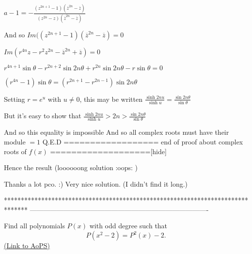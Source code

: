 \begin{solution}
$a-1=-\frac{(z^{2n+1}-1)(\overline z^{2n}-\overline z)}{(z^{2n}-z)(\overline z^{2n}-\overline z)}$

And so $Im((z^{2n+1}-1)(\overline z^{2n}-\overline z)=0$

$Im(r^{4n}z-r^2z^{2n}-\overline z^{2n}+\overline z)=0$

$r^{4n+1}\sin\theta -r^{2n+2}\sin 2n\theta +r^{2n}\sin 2n\theta -r\sin \theta=0$

$(r^{4n}-1)\sin\theta =(r^{2n+1}-r^{2n-1})\sin 2n\theta$

Setting $r=e^u$ with $u\ne 0$, this may be written $\frac{\sinh 2nu}{\sinh u}=\frac{\sin 2n\theta}{\sin\theta}$

But it's easy to show that $\frac{\sinh 2nu}{\sinh u}>2n>\frac{\sin 2n\theta}{\sin\theta}$

And so this equality is impossible
And so all complex roots must have their module $=1$
Q.E.D
================== end of proof about complex roots of $f(x)$ ===================[\/hide]

Hence the result
(loooooong solution :oops: )
\end{solution}



\begin{solution}
	Thanks a lot pco. :) Very nice solution. (I didn't find it long.)
\end{solution}
*******************************************************************************
-------------------------------------------------------------------------------

\begin{problem}
	Find all polynomials $P(x)$ with odd degree such that 
\[P(x^{2}-2)=P^{2}(x)-2.\]
	\flushright \href{https://artofproblemsolving.com/community/c6h397716}{(Link to AoPS)}
\end{problem}



